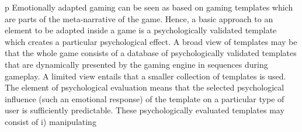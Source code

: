 p Emotionally adapted gaming can be seen as based on gaming templates which are parts of the meta-narrative of the game. Hence, a basic approach to an element to be adapted inside a game is a psychologically validated template which creates a particular psychological effect. A broad view of templates may be that the whole game consists of a database of psychologically validated templates that are dynamically presented by the gaming engine in sequences during gameplay. A limited view entails that a smaller collection of templates is used. The element of psychological evaluation means that the selected psychological influence (such an emotional response) of the template on a particular type of user is sufficiently predictable. These psychologically evaluated templates may consist of i) manipulating 

